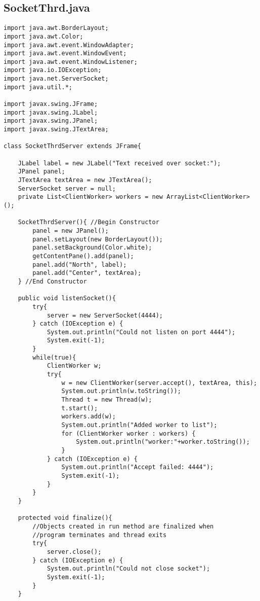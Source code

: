 \documentclass[10pt,a4paper]{article}
\begin{document}
\subsection{SocketThrd.java}
\begin{verbatim}
import java.awt.BorderLayout;
import java.awt.Color;
import java.awt.event.WindowAdapter;
import java.awt.event.WindowEvent;
import java.awt.event.WindowListener;
import java.io.IOException;
import java.net.ServerSocket;
import java.util.*;

import javax.swing.JFrame;
import javax.swing.JLabel;
import javax.swing.JPanel;
import javax.swing.JTextArea;

class SocketThrdServer extends JFrame{

    JLabel label = new JLabel("Text received over socket:");
    JPanel panel;
    JTextArea textArea = new JTextArea();
    ServerSocket server = null;
    private List<ClientWorker> workers = new ArrayList<ClientWorker>();

    SocketThrdServer(){ //Begin Constructor
        panel = new JPanel();
        panel.setLayout(new BorderLayout());
        panel.setBackground(Color.white);
        getContentPane().add(panel);
        panel.add("North", label);
        panel.add("Center", textArea);
    } //End Constructor

    public void listenSocket(){
        try{
            server = new ServerSocket(4444); 
        } catch (IOException e) {
            System.out.println("Could not listen on port 4444");
            System.exit(-1);
        }
        while(true){
            ClientWorker w;
            try{
                w = new ClientWorker(server.accept(), textArea, this);
                System.out.println(w.toString());
                Thread t = new Thread(w);
                t.start();
                workers.add(w);
                System.out.println("Added worker to list");
                for (ClientWorker worker : workers) {
                    System.out.println("worker:"+worker.toString());
                }
            } catch (IOException e) {
                System.out.println("Accept failed: 4444");
                System.exit(-1);
            }
        }
    }

    protected void finalize(){
        //Objects created in run method are finalized when 
        //program terminates and thread exits
        try{
            server.close();
        } catch (IOException e) {
            System.out.println("Could not close socket");
            System.exit(-1);
        }
    }


\end{verbatim}
\end{document}
